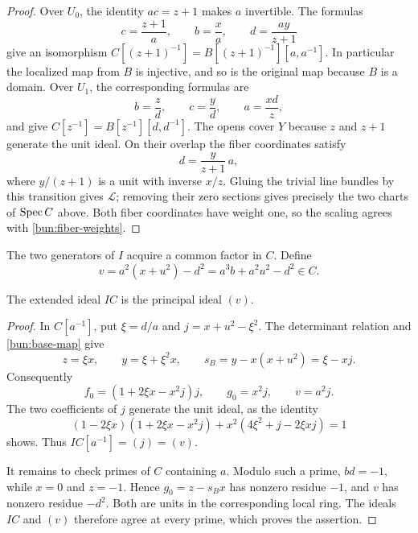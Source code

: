 \begin{proof}
Over $U_0$, the identity $ac=z+1$ makes $a$ invertible.  The formulas
\begin{equation}\label{bun:chart-a}
 c=\frac{z+1}{a},\qquad b=\frac{x}{a},\qquad
 d=\frac{ay}{z+1}
\end{equation}
give an isomorphism
$C[(z+1)^{-1}]=B[(z+1)^{-1}][a,a^{-1}]$.
In particular the localized map from $B$ is injective, and so is the
original map because $B$ is a domain.  Over $U_1$, the corresponding formulas
are
\begin{equation}\label{bun:chart-d}
 b=\frac{z}{d},\qquad c=\frac{y}{d},\qquad a=\frac{xd}{z},
\end{equation}
and give $C[z^{-1}]=B[z^{-1}][d,d^{-1}]$.
The opens cover $Y$ because $z$ and $z+1$ generate the unit ideal.  On their
overlap the fiber coordinates satisfy
\begin{equation}\label{bun:transition}
 d=\frac{y}{z+1}\,a,
\end{equation}
where $y/(z+1)$ is a unit with inverse $x/z$.  Gluing the trivial line bundles
by this transition gives $\mathcal L$; removing their zero sections gives
precisely the two charts of $\operatorname{Spec} C$ above.  Both fiber coordinates have
weight one, so the scaling agrees with \eqref{bun:fiber-weights}.
\end{proof}

The two generators of $I$ acquire a common factor in $C$.  Define
\begin{equation}\label{bun:v}
 v=a^2(x+u^2)-d^2=a^3b+a^2u^2-d^2\in C.
\end{equation}

\begin{lemma}\label{bun:principalization}
The extended ideal $IC$ is the principal ideal $(v)$.
\end{lemma}

\begin{proof}
In $C[a^{-1}]$, put $\xi=d/a$ and $j=x+u^2-\xi^2$.  The determinant relation
and \eqref{bun:base-map} give
\[
 z=\xi x,\qquad y=\xi+\xi^2x,\qquad
 s_B=y-x(x+u^2)=\xi-xj.
\]
Consequently
\begin{equation}\label{bun:ideal-chart}
 f_0=(1+2\xi x-x^2j)j,\qquad g_0=x^2j,\qquad v=a^2j.
\end{equation}
The two coefficients of $j$ generate the unit ideal, as the identity
\[
 (1-2\xi x)(1+2\xi x-x^2j)
   +x^2(4\xi^2+j-2\xi xj)=1
\]
shows.  Thus $IC[a^{-1}]=(j)=(v)$.

It remains to check primes of $C$ containing $a$.  Modulo such a prime,
$bd=-1$, while $x=0$ and $z=-1$.  Hence $g_0=z-s_Bx$ has nonzero residue
$-1$, and $v$ has nonzero residue $-d^2$.  Both are units in the corresponding
local ring.  The ideals $IC$ and $(v)$ therefore agree at every prime, which
proves the assertion.
\end{proof}

